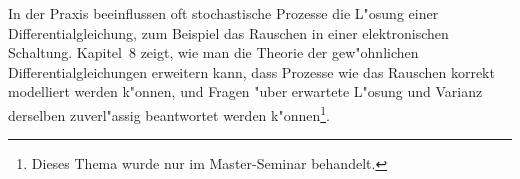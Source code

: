 In der Praxis beeinflussen oft stochastische Prozesse die L"osung einer
Differentialgleichung, zum Beispiel das Rauschen in einer elektronischen
Schaltung.
Kapitel~8 zeigt, wie man die Theorie der gew"ohnlichen Differentialgleichungen
erweitern kann, dass Prozesse wie das Rauschen korrekt modelliert 
werden k"onnen, und Fragen "uber erwartete L"osung und Varianz
derselben zuverl"assig beantwortet werden k"onnen\footnote{Dieses Thema
wurde nur im Master-Seminar behandelt.}.



